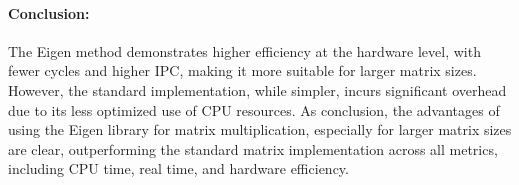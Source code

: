 \documentclass{article}
\begin{document}
    \paragraph{Conclusion:}
    The Eigen method demonstrates higher efficiency at the hardware level, with fewer cycles and higher IPC, making it more suitable for larger matrix sizes. However, the standard implementation, while simpler, incurs significant overhead due to its less optimized use of CPU resources. As conclusion, the advantages of using the Eigen library for matrix multiplication, especially for larger matrix sizes are clear, outperforming the standard matrix implementation across all metrics, including CPU time, real time, and hardware efficiency.
\end{document}
